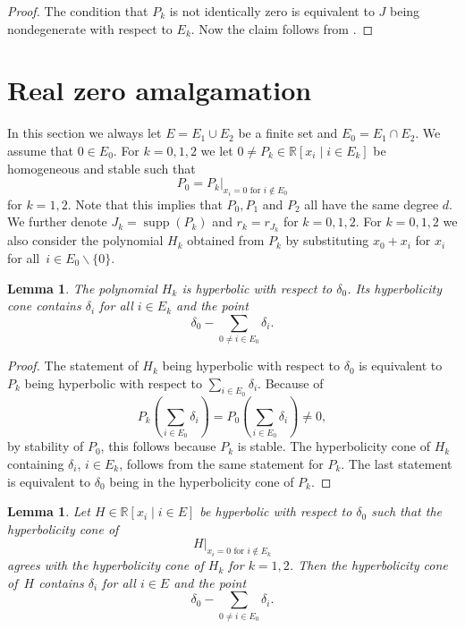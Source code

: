 \documentclass[11pt]{article}
\newtheorem{lem}[theo]{Lemma}
\theoremstyle{definition}
\numberwithin{equation}{section}
\newcommand{\R}{{\mathbb R}}
\newcommand{\supp}{\operatorname{supp}}
\begin{document}
\begin{proof}
    The condition that $P_k$ is not identically zero is equivalent to $J$ being nondegenerate with respect to $E_k$. Now the claim follows from .
\end{proof}

\section{Real zero amalgamation}\label{sec:amal}
In this section we always let $E=E_1\cup E_2$ be a finite set and $E_0=E_1\cap E_2$. We assume that $0\in E_0$. For $k=0,1,2$ we let $0\neq P_k\in\R[x_i\mid i\in E_k]$ be homogeneous and stable such that
\begin{equation*}
    P_0=P_k|_{x_i=0\textrm{ for }i\not\in E_0}
\end{equation*}
for $k=1,2$. Note that this implies that $P_0,P_1$ and $P_2$ all have the same degree $d$. We further denote $J_k=\supp(P_k)$ and $r_k=r_{J_k}$ for $k=0,1,2$. For $k=0,1,2$ we also consider the polynomial $H_k$ obtained from $P_k$ by substituting $x_0+x_i$ for $x_i$ for all~$i\in E_0\smallsetminus\{0\}$.

\begin{lem}\label{lem:hypcone1}
    The polynomial $H_k$ is hyperbolic with respect to $\delta_0$. Its hyperbolicity cone contains $\delta_i$ for all $i\in E_k$ and the point
    \begin{equation*}
        \delta_0-\sum_{0\neq i\in E_0}\delta_i.
    \end{equation*}
\end{lem}

\begin{proof}
    The statement of $H_k$ being hyperbolic with respect to $\delta_0$ is equivalent to $P_k$ being hyperbolic with respect to $\sum_{i\in E_0}\delta_i$. Because of
    \begin{equation*}
        P_k\left(\sum_{i\in E_0}\delta_i\right)=P_0\left(\sum_{i\in E_0}\delta_i\right)\neq0,
    \end{equation*}
    by stability of $P_0$, this follows because $P_k$ is stable. The hyperbolicity cone of $H_k$ containing $\delta_i$, $i\in E_k$, follows from the same statement for $P_k$. The last statement is equivalent to $\delta_0$ being in the hyperbolicity cone of $P_k$.
\end{proof}

\begin{lem}\label{lem:hypcone2}
    Let $H\in\R[x_i\mid i\in E]$ be hyperbolic with respect to $\delta_0$ such that the hyperbolicity cone of
    \begin{equation*}
     H|_{x_i=0\textrm{ for }i\not\in E_k}
    \end{equation*}
    agrees with the hyperbolicity cone of $H_k$ for $k=1,2$. Then the hyperbolicity cone of~$H$ contains $\delta_i$ for all $i\in E$ and the point
    \begin{equation*}
        \delta_0-\sum_{0\neq i\in E_0}\delta_i.
    \end{equation*}
\end{lem}
\end{document}
